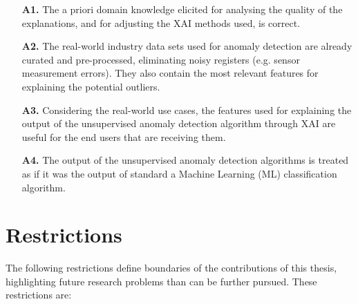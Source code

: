 \begin{itemize}
\item[\textbf{A1.}] The a priori domain knowledge elicited for analysing the quality of the explanations, and for adjusting the XAI methods used, is correct.

\item[\textbf{A2.}] The real-world industry data sets used for anomaly detection are already curated and pre-processed, eliminating noisy registers (e.g. sensor measurement errors). They also contain the most relevant features for explaining the potential outliers.  

\item[\textbf{A3.}] Considering the real-world use cases, the features used for explaining the output of the unsupervised anomaly detection algorithm through XAI are useful for the end users that are receiving them.

\item[\textbf{A4.}] The output of the unsupervised anomaly detection algorithms is treated as if it was the output of standard a Machine Learning (ML) classification algorithm.


\end{itemize}

\section{Restrictions}\label{sec:Restrictions}
The following restrictions define boundaries of the contributions of this thesis, highlighting future research problems than can be further pursued. These restrictions are:

